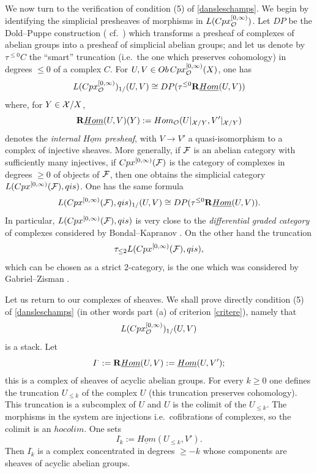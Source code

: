 We now turn to the verification of condition (5)
of \ref{dansleschamps}.
We begin by identifying the simplicial presheaves of morphisms
in $L(Cpx_{{\cal O}}^{[0, \infty )})$. Let $DP$ be the
Dold--Puppe construction (\cite{DoldPuppe} cf.\ \cite{Illusie}) which
transforms a
presheaf of complexes of abelian groups into a presheaf
of simplicial abelian
groups; and let us denote by $\tau ^{\leq 0} C$ the ``smart'' truncation
(i.e.\ the one
which preserves cohomology) in degrees $\leq 0$ of a complex $C$. For
$U,V\in Ob\,Cpx_{{\cal O}}^{[0, \infty )}(X)$, one has
$$
L(Cpx_{{\cal O}}^{[0, \infty )})_{1/}(U,V)
\cong DP(\tau ^{\leq 0} {\bf R} \underline{Hom} (U,V))
$$
where, for $Y\in {\cal X} /X$,
$$
{\bf R} \underline{Hom} (U,V)(Y):=
Hom _{{\cal O}}(U|_{{\cal X} /Y}, V'|_{{\cal X} /Y})
$$
denotes
the {\em internal $\underline{Hom}$ presheaf}, with $V\rightarrow V'$ a
quasi-isomorphism to a complex of injective sheaves.
More generally, if ${\cal F}$ is an abelian category with sufficiently
many injectives, if $Cpx^{[0, \infty )}({\cal F} )$ is the category of complexes
in degrees $\geq 0$ of objects of ${\cal F}$, then one obtains the simplicial
category $L(Cpx^{[0, \infty )}({\cal F} ), qis)$. One has the same formula
$$
L(Cpx^{[0, \infty )}({\cal F} ), qis)_{1/}(U,V)
\cong DP(\tau ^{\leq 0} {\bf R} \underline{Hom} (U,V)).
$$
In particular, $L(Cpx^{[0, \infty )}({\cal F} ), qis)$ is very close
to the {\em differential graded category} of complexes considered
by Bondal--Kapranov \cite{BondalKapranov}. On the other hand the truncation
$$
\tau _{\leq 2} L(Cpx^{[0, \infty )}({\cal F} ), qis),
$$
which can be chosen as
a strict $2$-category, is the one which was considered by
Gabriel--Zisman \cite{GabrielZisman}.

Let us return to our complexes of sheaves.
We shall prove directly condition (5) of \ref{dansleschamps}
(in other words part (a) of criterion \ref{critere}), namely that
$$
L(Cpx_{{\cal O}}^{[0, \infty )})_{1/}(U,V)
$$
is a stack. Let
$$
I^{\cdot}:= {\bf R} \underline{Hom} (U,V)
:= \underline{Hom} (U,V');
$$
this is a complex
of sheaves of acyclic abelian groups. For every $k\geq 0$ one
defines the truncation $U_{\leq k}$ of the complex $U$ (this
truncation preserves
cohomology). This truncation is a subcomplex of $U$ and $U$ is
the colimit of the $U_{\leq k}$. The morphisms in the system are
injections i.e.\ cofibrations of complexes, so the colimit is an
$hocolim$. One sets
$$
I^{\cdot}_{k} :=\underline{Hom} (U_{\leq k},V').
$$
Then $I^{\cdot }_{k}$ is a complex concentrated in degrees $\geq -k$
whose components are sheaves of acyclic abelian
groups.

